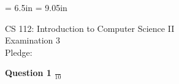 \textwidth = 6.5in
\textheight = 9.05in
\topmargin 0.0in
\oddsidemargin 0.0in
\evensidemargin 0.0in


\setcounter{secnumdepth}{3}
\setcounter{tocdepth}{3}

        
\def\widow#1{\vskip #1\vbadness10000\penalty-200\vskip-#1}


\def\littlesection#1{
\widow{2cm}
\vskip 0.5cm
\noindent{\bf #1}
\vskip 0.1cm
\noindent
}


\newdimen\tmpdim
\long{}

\renewcommand{\baselinestretch}{1.2}    %
\newtheorem{principle}{Principle}
\newtheorem{definition}{Definition}
\newtheorem{define}{Definition}



\vspace*{3in}

\begin{center}

CS 112: Introduction to Computer Science II \\
Examination 3 \\
Pledge: \\

\end{center}

\newpage

\Large

{\bf Question 1} \hspace*{.2in} \Large{$\frac{}{10}$}

\newpage

